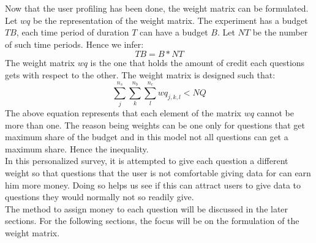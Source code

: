 Now that the user profiling has been done, the weight matrix can be formulated. Let $wq$ be the representation of the weight matrix. The experiment has a budget $TB$, each time period of duration $T$ can
have a budget $B$. Let $NT$ be the number of such time periods. Hence we infer:
$$TB = B*NT$$
The weight matrix $wq$ is the one that holds the amount of credit each questions gets with respect to the other. The weight matrix is
designed such that:
$$\sum^{n_s}_{j}\sum^{n_b}_{k}\sum^{n_c}_{l} wq_{j,k,l} < NQ$$ 
The above equation represents that each element of the matrix $wq$ cannot be more than one. The reason being
weights can be one only for questions that get maximum share of the budget and in this model
not all questions can get a maximum share. Hence the inequality.\\
In this personalized survey, it is attempted to give each question a different
weight so that questions that the user is not comfortable giving data for can earn him more money. Doing so helps us see if this can attract users to give data to questions they would normally not so readily give.\\
The method to assign money to each question will be discussed in the later sections. For the following sections, the focus
will be on the formulation of the weight matrix. 

